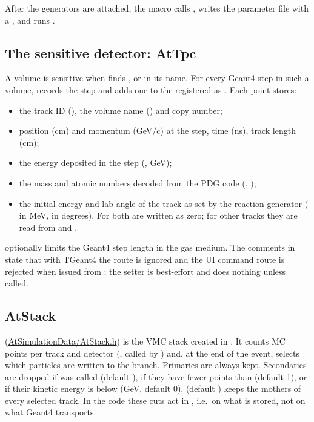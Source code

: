 After the generators are attached, the macro calls , writes the parameter
file with a , and runs .

\subsection{The sensitive detector: AtTpc}

A volume is sensitive when  finds ,
 or  in its name. For every Geant4 step in such a volume,
 records the step and adds one  to the
 registered as . Each point stores:

\begin{itemize}
  \item the track ID (), the volume name () and copy number;
  \item position (cm) and momentum (GeV/c) at the step, time (ns), track length (cm);
  \item the energy deposited in the step (, GeV);
  \item the mass and atomic numbers decoded from the PDG code (,
    );
  \item the initial energy and lab angle of the track as set by the reaction generator
    ( in MeV,  in degrees). For  both are written as
    zero; for other tracks they are read from  and
    .
\end{itemize}

 optionally limits the Geant4 step length in the gas medium. The
comments in  state that with TGeant4 the  route is ignored and
the UI command route is rejected when issued from ; the setter is best-effort and
does nothing unless called.

\subsection{AtStack}

 (\url{AtSimulationData/AtStack.h}) is the VMC stack created in
. It counts MC points per track and detector (, called by
) and, at the end of the event, selects which particles are written to the
 branch. Primaries are always kept. Secondaries are dropped if
 was called (default ), if they have fewer points than
 (default 1), or if their kinetic energy is below  (GeV,
default 0).  (default ) keeps the mothers of every selected track.
In the code these cuts act in , i.e.\ on what is stored, not on what
Geant4 transports.

